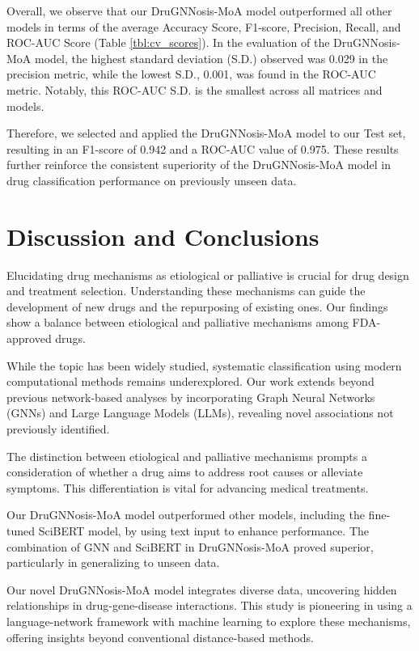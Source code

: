 \documentclass[journal,twoside,web]{ieeecolor}
\begin{document}
Overall, we observe that our DruGNNosis-MoA model outperformed all other models in terms of the average Accuracy Score, F1-score, Precision, Recall, and ROC-AUC Score (Table \ref{tbl:cv_scores}).
In the evaluation of the DruGNNosis-MoA model, the highest standard deviation (S.D.) observed was 0.029 in the precision metric, while the lowest S.D., 0.001, was found in the ROC-AUC metric.
Notably, this ROC-AUC S.D. is the smallest across all matrices and models.

Therefore, we selected and applied the DruGNNosis-MoA model to our Test set,
resulting in an F1-score of 0.942 and a ROC-AUC value of 0.975.
These results further reinforce the consistent superiority of the DruGNNosis-MoA model in drug classification performance on previously unseen data.

\section{Discussion and Conclusions}
Elucidating drug mechanisms as etiological or palliative is crucial for drug design and treatment selection. 
Understanding these mechanisms can guide the development of new drugs and the repurposing of existing ones. 
Our findings show a balance between etiological and palliative mechanisms among FDA-approved drugs.

While the topic has been widely studied, systematic classification using modern computational methods remains underexplored. 
Our work extends beyond previous network-based analyses by incorporating Graph Neural Networks (GNNs) and Large Language Models (LLMs), revealing novel associations not previously identified.

The distinction between etiological and palliative mechanisms prompts a consideration of whether a drug aims to address root causes or alleviate symptoms. 
This differentiation is vital for advancing medical treatments.

Our DruGNNosis-MoA model outperformed other models, including the fine-tuned SciBERT model, by using text input to enhance performance. 
The combination of GNN and SciBERT in DruGNNosis-MoA proved superior, particularly in generalizing to unseen data.

Our novel DruGNNosis-MoA model integrates diverse data, uncovering hidden relationships in drug-gene-disease interactions. 
This study is pioneering in using a language-network framework with machine learning to explore these mechanisms, offering insights beyond conventional distance-based methods.
\end{document}
